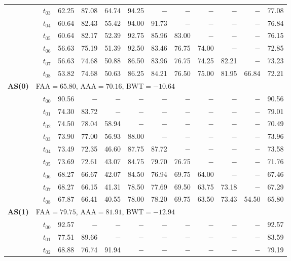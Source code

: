 \begin{table}[ht]
\begin{tabular}{@{}l l l *{10}{r}@{}}
 & & $t_{03}$ & 62.25 & 87.08 & 64.74 & 94.25 & $-$ & $-$ & $-$ & $-$ & $-$ & 77.08 \\
 & & $t_{04}$ & 60.64 & 82.43 & 55.42 & 94.00 & 91.73 & $-$ & $-$ & $-$ & $-$ & 76.84 \\
 & & $t_{05}$ & 60.64 & 82.17 & 52.39 & 92.75 & 85.96 & 83.00 & $-$ & $-$ & $-$ & 76.15 \\
 & & $t_{06}$ & 56.63 & 75.19 & 51.39 & 92.50 & 83.46 & 76.75 & 74.00 & $-$ & $-$ & 72.85 \\
 & & $t_{07}$ & 56.63 & 74.68 & 50.88 & 86.50 & 83.96 & 76.75 & 74.25 & 82.21 & $-$ & 73.23 \\
 & & $t_{08}$ & 53.82 & 74.68 & 50.63 & 86.25 & 84.21 & 76.50 & 75.00 & 81.95 & 66.84 & 72.21 \\
\midrule
\multirow{10}{*}{\textbf{AS(0)}} & \multicolumn{11}{l}{\quad\small FAA$=65.80$,\; AAA$=70.16$,\; BWT$=-10.64$} \\
 & & $t_{00}$ & 90.56 & $-$ & $-$ & $-$ & $-$ & $-$ & $-$ & $-$ & $-$ & 90.56 \\
 & & $t_{01}$ & 74.30 & 83.72 & $-$ & $-$ & $-$ & $-$ & $-$ & $-$ & $-$ & 79.01 \\
 & & $t_{02}$ & 74.50 & 78.04 & 58.94 & $-$ & $-$ & $-$ & $-$ & $-$ & $-$ & 70.49 \\
 & & $t_{03}$ & 73.90 & 77.00 & 56.93 & 88.00 & $-$ & $-$ & $-$ & $-$ & $-$ & 73.96 \\
 & & $t_{04}$ & 73.49 & 72.35 & 46.60 & 87.75 & 87.72 & $-$ & $-$ & $-$ & $-$ & 73.58 \\
 & & $t_{05}$ & 73.69 & 72.61 & 43.07 & 84.75 & 79.70 & 76.75 & $-$ & $-$ & $-$ & 71.76 \\
 & & $t_{06}$ & 68.27 & 66.67 & 42.07 & 84.50 & 76.94 & 69.75 & 64.00 & $-$ & $-$ & 67.46 \\
 & & $t_{07}$ & 68.27 & 66.15 & 41.31 & 78.50 & 77.69 & 69.50 & 63.75 & 73.18 & $-$ & 67.29 \\
 & & $t_{08}$ & 67.87 & 66.41 & 40.55 & 78.00 & 78.20 & 69.75 & 63.50 & 73.43 & 54.50 & 65.80 \\
\midrule
\multirow{10}{*}{\textbf{AS(1)}} & \multicolumn{11}{l}{\quad\small FAA$=79.75$,\; AAA$=81.91$,\; BWT$=-12.94$} \\
 & & $t_{00}$ & 92.57 & $-$ & $-$ & $-$ & $-$ & $-$ & $-$ & $-$ & $-$ & 92.57 \\
 & & $t_{01}$ & 77.51 & 89.66 & $-$ & $-$ & $-$ & $-$ & $-$ & $-$ & $-$ & 83.59 \\
 & & $t_{02}$ & 68.88 & 76.74 & 91.94 & $-$ & $-$ & $-$ & $-$ & $-$ & $-$ & 79.19 \\

\end{tabular}
\end{table}
